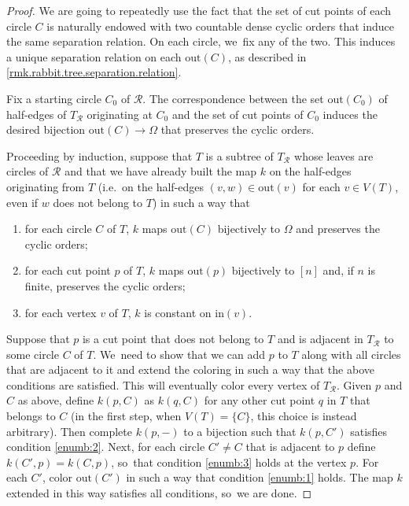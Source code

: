 \documentclass[10pt,a4paper]{amsart}
\newcommand{\ie}{i.e.\ }
\theoremstyle{definition}
\newcommand{\R}{\mathcal{R}}
\begin{document}
\begin{proof}
We are going to repeatedly use the fact that the set of cut points of each circle $C$ is naturally endowed with two countable dense cyclic orders that induce the same separation relation.
On each circle, we~fix any of the two.
This induces a unique separation relation on each $\mathrm{out}(C)$, as described in \cref{rmk.rabbit.tree.separation.relation}.

Fix a starting circle $C_0$ of $\R$.
The correspondence between the set $\mathrm{out}(C_0)$ of half-edges of $T_\R$ originating at $C_0$ and the set of cut points of $C_0$ induces the desired bijection $\mathrm{out}(C) \to \Omega$ that preserves the cyclic orders.

Proceeding by induction, suppose that $T$ is a subtree of $T_\R$ whose leaves are circles of $\R$ and that we have already built the map $k$ on the half-edges originating from $T$ (\ie on the half-edges $(v,w) \in \mathrm{out}(v)$ for each $v \in V(T)$, even if $w$ does not belong to $T$) in such a way that
\begin{enumerate}
\item\label{enumb:1} for each circle $C$ of $T$, $k$ maps $\mathrm{out}(C)$ bijectively to $\Omega$ and preserves the cyclic orders;
\item\label{enumb:2} for each cut point $p$ of $T$, $k$ maps $\mathrm{out}(p)$ bijectively to $[n]$ and, if $n$ is finite, preserves the cyclic orders;
\item\label{enumb:3} for each vertex $v$ of $T$, $k$ is constant on $\mathrm{in}(v)$.
\end{enumerate}
Suppose that $p$ is a cut point that does not belong to $T$ and is adjacent in $T_\R$ to some circle $C$ of $T$. We~need to show that we can add $p$ to $T$ along with all circles that are adjacent to it and extend the coloring in such a way that the above conditions are satisfied.
This will eventually color every vertex of $T_\R$.
Given $p$ and $C$ as above, define $k(p,C)$ as $k(q,C)$ for any other cut point $q$ in $T$ that belongs to $C$ (in the first step, when $V(T) = \{C\}$, this choice is instead arbitrary).
Then complete $k(p,-)$ to a bijection such that $k(p,C')$ satisfies condition \cref{enumb:2}.
Next, for each circle $C' \neq C$ that is adjacent to $p$ define $k(C',p) = k(C,p)$, so~that condition \cref{enumb:3} holds at the vertex $p$.
For each $C'$, color $\mathrm{out}(C')$ in such a way that condition \cref{enumb:1} holds.
The map $k$ extended in this way satisfies all conditions, so~we are done.
\end{proof}
\end{document}
